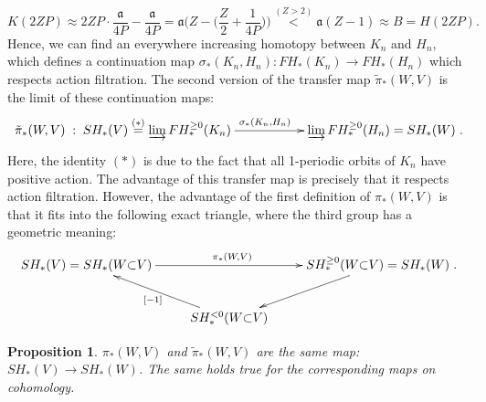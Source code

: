\documentclass[a4paper,12pt,bibliography=totocnumbered,titlepage=false,abstracton,bookmarksnumbered=true]{scrartcl}
\newtheorem{prop}[defn]{Proposition}
\theoremstyle{definition}
\begin{document}
\[K(2ZP)\approx 2ZP{\cdot}\frac{\mathfrak{a}}{4P}-\frac{\mathfrak{a}}{4P}=\mathfrak{a}\Big(Z-\Big(\frac{Z}{2}{+}\frac{1}{4P}\Big)\Big)\overset{(Z>2)}{<}\mathfrak{a}(Z{-}1)\approx B=H(2ZP).\]
Hence, we can find an everywhere increasing homotopy between $K_n$ and $H_n$, which defines a continuation map $\sigma_\ast(K_n,H_n):FH_\ast(K_n)\rightarrow FH_\ast(H_n)$ which respects action filtration. The second version of the transfer map $\tilde{\pi}_\ast(W,V)$ is the limit of these continuation maps:
\[\begin{xy}\xymatrix{\tilde{\pi}_\ast(W,V)\;:\; SH_\ast(V)\overset{(\ast)}{=}\varinjlim FH^{\geq 0}_\ast(K_n)\ar[rr]^{\qquad\sigma_\ast(K_n,H_n)} && \varinjlim FH^{\geq 0}_\ast(H_n)=SH_\ast(W)}\end{xy}.\]
Here, the identity $(\ast)$ is due to the fact that all 1-periodic orbits of $K_n$ have positive action. The advantage of this transfer map is precisely that it respects action filtration. However, the advantage of the first definition of $\pi_\ast(W,V)$ is that it fits into the following exact triangle, where the third group has a geometric meaning:
\[\begin{xy}\xymatrix{SH_\ast(V)=SH_\ast(W{\subset} V)\ar[rr]^{\pi_\ast(W,V)} && SH_\ast^{\geq 0}(W{\subset} V)=SH_\ast(W) \ar[dl]\\ & \ar[ul]^{[-1]} SH_\ast^{<0}(W{\subset} V)}\end{xy}.\]
\begin{prop}
 $\pi_\ast(W,V)$ and $\tilde{\pi}_\ast(W,V)$ are the same map: $SH_\ast(V)\rightarrow SH_\ast(W)$. The same holds true for the corresponding maps on cohomology.
\end{prop}
\end{document}

